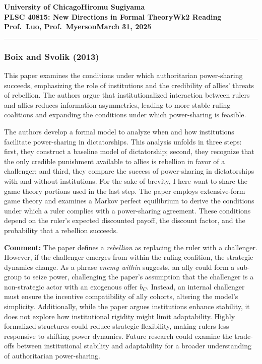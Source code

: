 \documentclass[11pt]{article}    %
\newcommand{\myname}{Hiromu Sugiyama}
\newcommand{\assignment}{Wk2 Reading}
\newcommand{\duedate}{March 31, 2025}
\begin{document}
\textbf{University of Chicago}\hfill\textbf{\myname}\\[0.01in]
\textbf{PLSC 40815: New Directions in Formal Theory}\hfill\textbf{\assignment}\\[0.01in]
\textbf{Prof.\ Luo, Prof.\ Myerson}\hfill\textbf{\duedate}\\
\smallskip\hrule\bigskip

\doublespace                      %

\subsubsection*{Boix and Svolik (2013)}
This paper examines the conditions under which authoritarian power-sharing succeeds, emphasizing the role of institutions and the credibility of allies' threats of rebellion. The authors argue that institutionalized interaction between rulers and allies reduces information asymmetries, leading to more stable ruling coalitions and expanding the conditions under which power-sharing is feasible. 

The authors develop a formal model to analyze when and how institutions facilitate power-sharing in dictatorships. This analysis unfolds in three steps: first, they construct a baseline model of dictatorship; second, they recognize that the only credible punishment available to allies is rebellion in favor of a challenger; and third, they compare the success of power-sharing in dictatorships with and without institutions. For the sake of brevity, I here want to share the game theory portions used in the last step. The paper employs extensive-form game theory and examines a Markov perfect equilibrium to derive the conditions under which a ruler complies with a power-sharing agreement. These conditions depend on the ruler’s expected discounted payoff, the discount factor, and the probability that a rebellion succeeds.

\textbf{Comment:} The paper defines a \textit{rebellion} as replacing the ruler with a challenger. However, if the challenger emerges from within the ruling coalition, the strategic dynamics change. As a phrase \textit{enemy within} suggests, an ally could form a sub-group to seize power, challenging the paper’s assumption that the challenger is a non-strategic actor with an exogenous offer $b_{C}$. Instead, an internal challenger must ensure the incentive compatibility of ally cohorts, altering the model’s simplicity. Additionally, while the paper argues institutions enhance stability, it does not explore how institutional rigidity might limit adaptability. Highly formalized structures could reduce strategic flexibility, making rulers less responsive to shifting power dynamics. Future research could examine the trade-offs between institutional stability and adaptability for a broader understanding of authoritarian power-sharing.
\end{document}

